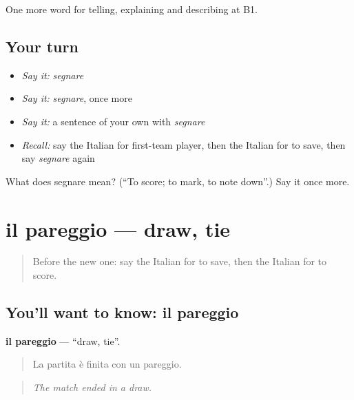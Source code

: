 \begin{grammarlens}[title={What you've built}]
One more word for telling, explaining and describing at B1.
\end{grammarlens}

\subsection*{Your turn}
\begin{itemize}
\raggedright
  \item \emph{Say it:} \emph{segnare}
  \item \emph{Say it:} \emph{segnare}, once more
  \item \emph{Say it:} a sentence of your own with \emph{segnare}
  \item \emph{Recall:} say the Italian for first-team player, then the Italian for to save, then say \emph{segnare} again
\end{itemize}

\begin{tcolorbox}[breakable,colback=teal!4,colframe=teal!35!black,title={Before you move on}]
What does segnare mean? (\textquotedblleft{}To score; to mark, to note down\textquotedblright{}.) Say it once more.
\end{tcolorbox}
\section[il pareggio]{il pareggio — draw, tie}

\label{lesson:IT-C511-pareggio}



\begin{quote}
Before the new one: say the Italian for to save, then the Italian for to score.
\end{quote}

\subsection*{You'll want to know: il pareggio}
\textbf{il pareggio} — \textquotedblleft{}draw, tie\textquotedblright{}.

\begin{quote}
La partita è finita con un pareggio.
\end{quote}

\begin{quote}
\emph{The match ended in a draw.}
\end{quote}

